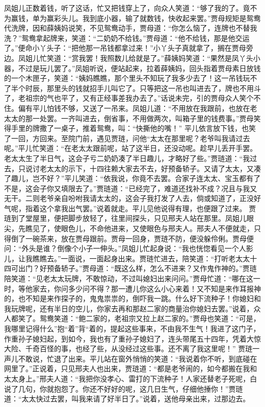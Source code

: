 \documentclass[12pt,oneside]{book}
\begin{document}
凤姐儿正数着钱，听了这话，忙又把钱穿上了，向众人笑道：“够了我的了。竟不为赢钱，单为赢彩头儿。我到底小器，输了就数钱，快收起来罢。”贾母规矩是鸳鸯代洗牌，因和薛姨妈说笑，不见鸳鸯动手，贾母道：“你怎么恼了，连牌也不替我洗？”鸳鸯拿起牌来，笑道：“二奶奶不给钱。”贾母道：“他不给钱，那是他交运了。”便命小丫头子：“把他那一吊钱都拿过来！”小丫头子真就拿了，搁在贾母旁边。凤姐儿忙笑道：“赏我罢！我照数儿给就是了。”薛姨妈笑道：“果然是凤丫头小器，不过是玩儿罢了。”凤姐听说，便站起来，拉着薛姨妈，回头指着贾母素日放钱的一个木匣子，笑道：“姨妈瞧瞧，那个里头不知玩了我多少去了！这一吊钱玩不了半个时辰，那里头的钱就招手儿叫它了。只等把这一吊也叫进去了，牌也不用斗了，老祖宗的气也平了，又有正经事差我办去了。”话说未完，引的贾母众人笑个不住。偏有平儿怕钱不够，又送了一吊来。凤姐儿道：“不用放在我跟前，也放在老太太的那一处罢。一齐叫进去，倒省事，不用做两次，叫箱子里的钱费事。”贾母笑得手里的牌撒了一桌子，推着鸳鸯，叫：“快撕他的嘴！”
平儿依言放下钱，也笑了一回，方回来。至院门前，遇见贾琏，问他“太太在那里呢？老爷叫我请过去呢。”平儿忙笑道：“在老太太跟前呢，站了这半日，还没动呢。趁早儿丢开手罢。老太太生了半日气，这会子亏二奶奶凑了半日趣儿，才略好了些。”贾琏道：“我过去，只说讨老太太的示下，十四往赖大家去不去，好预备轿子。又请了太太，又凑了趣儿，岂不好？”平儿笑道：“依我说，你竟不去罢。合家子连太太、宝玉都有了不是，这会子你又填限去了。”贾琏道：“已经完了，难道还找补不成？况且与我又无干。二则老爷亲自吩咐我请太太的，这会子我打发了人去，倘或知道了，正没好气呢，指着这个拿我出气罢。”说着就走。平儿见他说得有理，也便跟了过来。
贾琏到了堂屋里，便把脚步放轻了，往里间探头，只见邢夫人站在那里。凤姐儿眼尖，先瞧见了，使眼色儿，不命他进来，又使眼色与邢夫人。邢夫人不便就走，只得倒了一碗茶来，放在贾母跟前。贾母一回身，贾琏不防，便没躲伶俐。贾母便问：“外头是谁？倒像个小子一伸头。”凤姐儿忙起身说：“我也恍惚看见一个人影儿，让我瞧瞧去。”一面说，一面起身出来。贾琏忙进去，陪笑道：“打听老太太十四可出门？好预备轿子。”贾母道：“既这么样，怎么不进来？又作鬼作神的。”贾琏陪笑道：“见老太太玩牌，不敢惊动，不过叫媳妇出来问问。”贾母忙道：“哪在这一时，等他家去，你问多少问不得？那一遭儿你这么小心来着！又不知是来作耳报神的，也不知是来作探子的，鬼鬼祟祟的，倒吓我一跳。什么好下流种子！你媳妇和我玩牌呢，还有半日的空儿，你家去再和那赵二家的商量治你媳妇去罢。”说着，众人都笑了。鸳鸯笑道：“鲍二家的，老祖宗又拉上赵二家的。”贾母也笑道：“可是，我哪里记得什么”抱“着”背“着的，提起这些事来，不由我不生气！我进了这门子，作重孙子媳妇起，到如今，我也有了重孙子媳妇了，连头带尾五十四年，凭着大惊大险、千奇百怪的事，也经了些，从没经过这些事。还不离了我这里呢！”
贾琏一声儿不敢说，忙退了出来。平儿站在窗外悄悄的笑道：“我说着你不听，到底碰在网里了。”正说着，只见邢夫人也出来，贾琏道：“都是老爷闹的，如今都搬在我和太太身上。”邢夫人道：“我把你没孝心、雷打的下流种子！人家还替老子死呢，白说了几句，你就抱怨了。你还不好好的呢，这几日生气，仔细他捶你！”贾琏道：“太太快过去罢，叫我来请了好半日了。”说着，送他母亲出来，过那边去。
\end{document}
